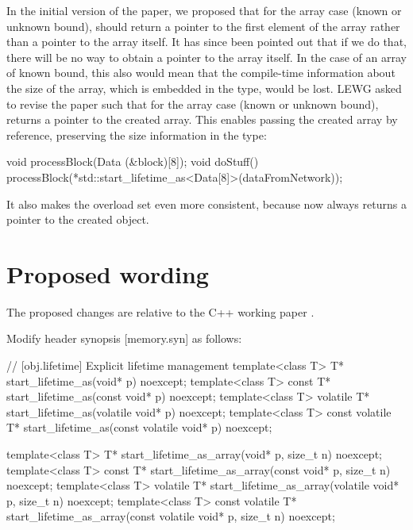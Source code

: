 In the initial version of the paper, we proposed that for the array case (known or unknown bound),  should return a pointer to the first element of the array rather than a pointer to the array itself. It has since been pointed out that if we do that, there will be no way to obtain a pointer to the array itself. In the case of an array of known bound, this also would mean that the compile-time information about the size of the array, which is embedded in the type, would be lost. LEWG asked to revise the paper such that for the array case (known or unknown bound),  returns a pointer to the created array. This enables passing the created array by reference, preserving the size information in the type:

\pagebreak %

\begin{codeblock}
void processBlock(Data (&block)[8]);
void doStuff() {
  processBlock(*std::start_lifetime_as<Data[8]>(dataFromNetwork));
}
\end{codeblock}
It also makes the overload set even more consistent, because now  always returns a pointer to the created object.
\section{Proposed wording}
\label{sec:wording}

The proposed changes are relative to the C++ working paper \cite{N4917}.

Modify header  synopsis [memory.syn] as follows:


\begin{codeblock}
// [obj.lifetime] Explicit lifetime management
template<class T>
  T* start_lifetime_as(void* p) noexcept;
template<class T>
  const T* start_lifetime_as(const void* p) noexcept;
template<class T>
  volatile T* start_lifetime_as(volatile void* p) noexcept;
template<class T>
  const volatile T* start_lifetime_as(const volatile void* p) noexcept;
\end{codeblock}

\begin{removedblock}
\begin{codeblock}
template<class T>
  T* start_lifetime_as_array(void* p, size_t n) noexcept;
template<class T>
  const T* start_lifetime_as_array(const void* p, size_t n) noexcept;
template<class T>
  volatile T* start_lifetime_as_array(volatile void* p, size_t n) noexcept;
template<class T>
  const volatile T* start_lifetime_as_array(const volatile void* p, size_t n) noexcept;
\end{codeblock}
\end{removedblock}

